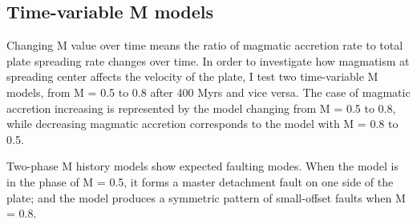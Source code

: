 \documentclass[letterpaper,12pt,notitle]{memphisthesis}                     %
\begin{document}
\subsection{Time-variable M models}

Changing M value over time means the ratio of magmatic accretion rate to total plate spreading rate changes over time. In order to investigate how magmatism at spreading center affects the velocity of the plate, I test two time-variable M models, from M = 0.5 to 0.8 after 400 Myrs and vice versa. The case of magmatic accretion increasing is represented by the model changing from M = 0.5 to 0.8, while decreasing magmatic accretion corresponds to the model with M = 0.8 to 0.5.

Two-phase M history models show expected faulting modes. When the model is in the phase of M = 0.5, it forms a master detachment fault on one side of the plate; and the model produces a symmetric pattern of small-offset faults when M = 0.8.
\end{document}
